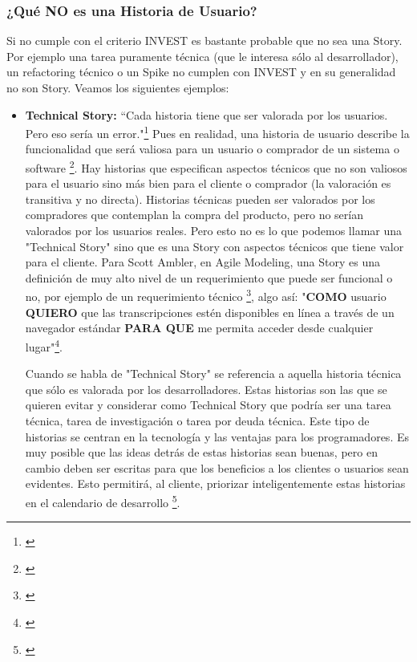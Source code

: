\subsubsection{¿Qué NO es una Historia de Usuario?}

Si no cumple con el criterio INVEST es bastante probable que no sea una Story. Por ejemplo una tarea puramente técnica (que le interesa sólo al desarrollador), un refactoring técnico o un Spike no cumplen con INVEST y en su generalidad no son Story. 
Veamos los siguientes ejemplos:

\begin{itemize}

\item \textbf{Technical Story:}
“Cada historia tiene que ser valorada por los usuarios. Pero eso sería un error."\footnote{\cite{Cohn-2004}} Pues en realidad, una historia de usuario describe la funcionalidad que será valiosa para un usuario o comprador de un sistema o software \footnote{\cite{Cohn-2004}}. Hay historias que especifican aspectos técnicos que no son valiosos para el usuario sino más bien para el cliente o comprador (la valoración es transitiva y no directa). Historias técnicas pueden ser valorados por los compradores que contemplan la compra del producto, pero no serían valorados por los usuarios reales. Pero esto no es lo que podemos llamar una "Technical Story" sino que es una Story con aspectos técnicos que tiene valor para el cliente. Para Scott Ambler, en Agile Modeling, una Story es una definición de muy alto nivel de un requerimiento que puede ser funcional o no, por ejemplo de un requerimiento técnico \footnote{\cite{Scott-Ambler-2015}}, algo así: "\textbf{COMO} usuario \textbf{QUIERO} que las transcripciones estén disponibles en línea a través de un navegador estándar \textbf{PARA QUE} me permita acceder desde cualquier lugar"\footnote{\cite{Scott-Ambler-2015}}.

Cuando se habla de "Technical Story" se referencia a aquella historia técnica que sólo es valorada por los desarrolladores. Estas historias son las que se quieren evitar y considerar como Technical Story que podría ser una tarea técnica, tarea de investigación o tarea por deuda técnica. Este tipo de historias se centran en la tecnología y las ventajas para los programadores. Es muy posible que las ideas detrás de estas historias sean buenas, pero en cambio deben ser escritas para que los beneficios a los clientes o usuarios sean evidentes. Esto permitirá, al cliente, priorizar inteligentemente estas historias en el calendario de desarrollo \footnote{\cite{Cohn-2004}}.


\end{itemize}
